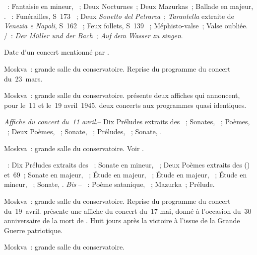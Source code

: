 \begin{description}
 \textsc{\Chopin{}}~: Fantaisie en \kF mineur, ~; Deux Nocturnes~;
 Deux Mazurkas~; Ballade en \kA \Flat majeur, .
 \textsc{\Liszt{}}~: Funérailles, S~173 ~; Deux \emph{Sonetto del
 Petrarca}~; \emph{Tarantella} extraite de \emph{Venezia e Napoli}, S~162
 ~; Feux follets, S~139 ~; Méphisto-valse~; Valse
 oubliée.
 \textsc{\Schubert{}/\Liszt{}}~: \emph{Der Müller und der Bach}~; \emph{Auf
 dem Wasser zu singen}.
 \item[\DateWithWeekDay{1945-03-28}]
 Date d'un concert mentionné par \citet[p.~167]{Nekrasova08}.
 \item[\DateWithWeekDay{1945-04-03}]
 Moskva~: grande salle du conservatoire.
 Reprise du programme du concert du~23~mars.
 \item[\DateWithWeekDay{1945-04-11}]
 Moskva~: grande salle du conservatoire.
 \citet{Lazarev20} présente deux affiches qui annoncent, pour le~11 et le~19
 avril~1945, deux concerts aux programmes quasi identiques.

 \emph{Affiche du concert du~11 avril}.--
 Dix Préludes extraits des ~; Sonates,
 ~; Poèmes, ~; Deux Poèmes, ~;
 Sonate, ~; Préludes, ~; Sonate, .
 \item[\DateWithWeekDay{1945-04-19}]
 Moskva~: grande salle du conservatoire.
 Voir \citet{Lazarev20}.

 \textsc{\Scriabine{}}~: Dix Préludes extraits des ~; Sonate en \kF \Sharp mineur, ~; Deux Poèmes extraits des
  () et~69~; Sonate en \kF \Sharp majeur, ~;
 Étude en \kB majeur,  ~; Étude en \kA \Flat majeur,
  ~; Étude en \kG \Sharp mineur,  ~;
 Sonate, .
 \emph{Bis} -- \textsc{\Scriabine{}}~: Poème satanique, ~;
 Mazurka~; Prélude.
 \item[\DateWithWeekDay{1945-05-17}]
 Moskva~: grande salle du conservatoire.
 Reprise du programme du concert du~19~avril.
 \citet{Lazarev20} présente une affiche du concert du~17 mai, donné à
 l'occasion du~30\ieme{} anniversaire de la mort de \Scriabine{}.
 Huit jours après la victoire à l'issue de la Grande Guerre patriotique.
 \item[\DateWithWeekDay{1945-06-05}]
 Moskva~: grande salle du conservatoire.


\end{description}
